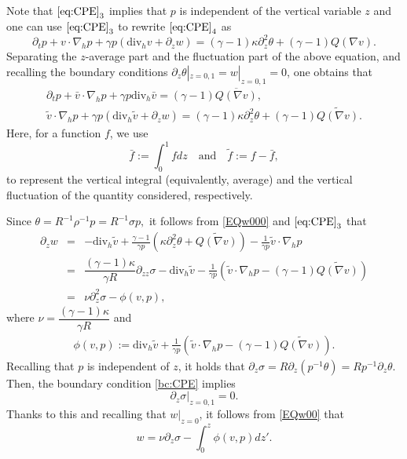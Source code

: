 \documentclass[12pt,reqno]{amsart}
\numberwithin{equation}{section}
\newcommand{\dz}[0]{\partial_z}
\newcommand{\subeqref}[2]{$\eqref{#1}_{#2}$}
\begin{document}
Note that \subeqref{eq:CPE}{3} implies that $p$ is independent of the vertical variable $z$ and one can use \subeqref{eq:CPE}{3} to rewrite \subeqref{eq:CPE}{4} as
\begin{equation*}
 \partial_tp+v\cdot\nabla_hp+\gamma p(\text{div}_hv+\partial_zw)=(\gamma-1)\kappa\partial_z^2\theta+(\gamma-1)Q(\nabla v).
\end{equation*}
Separating the $z$-average part and the fluctuation part of the above equation, and recalling the boundary conditions $\partial_z\theta|_{z=0,1}=w|_{z=0,1}=0$, one obtains that
\begin{eqnarray}
 \partial_tp+\bar v\cdot\nabla_hp+\gamma p\text{div}_h\bar v=(\gamma-1)\overline{Q(\nabla v)},\label{EQp00}\\
\tilde v\cdot\nabla_hp+\gamma p(\text{div}_h\tilde v+\partial_zw)=(\gamma-1)\kappa\partial_z^2\theta+(\gamma-1)\widetilde{Q(\nabla v)}. \label{EQw000}
\end{eqnarray}
Here, for a function $f$, we use
\begin{equation}\label{TBf}
\bar f:=\int_0^1f dz\quad\mbox{and}\quad  \tilde f:=f-\bar f,
\end{equation}
to represent the vertical integral (equivalently, average) and the vertical fluctuation of the quantity considered, respectively.

Since $\theta = R^{-1} \rho^{-1} p=R^{-1}\sigma p,$
it follows from \eqref{EQw000} and \subeqref{eq:CPE}{3} that
\begin{eqnarray}\label{eq:dz-w}
		 \dz w &=&-\text{div}_h\tilde v+\frac{\gamma-1}{\gamma p}\left(\kappa\partial_z^2\theta+\widetilde{Q(\nabla v)}\right)-\frac{1}{\gamma p}\tilde v\cdot\nabla_hp\nonumber\\
&=&\dfrac{(\gamma-1)\kappa}{\gamma R}\partial_{zz} \sigma -\text{div}_h\tilde v-\frac{1}{\gamma p}\left(\tilde v\cdot\nabla_hp-(\gamma-1)\widetilde{Q(\nabla v)}\right)\nonumber\\
&=&\nu\partial_z^2\sigma-\phi(v,p),\label{EQw00}
\end{eqnarray}
where $\nu=\dfrac{(\gamma-1)\kappa}{\gamma R}$ and
\begin{eqnarray}
  \phi(v,p):=\text{div}_h\tilde v+\frac{1}{\gamma p}\left(\tilde v\cdot\nabla_hp-(\gamma-1)\widetilde{Q(\nabla v)}\right).\label{phi}
\end{eqnarray}
Recalling that $p$ is independent of $z$, it holds that $\dz\sigma=R\dz(p^{-1}\theta)= R p^{-1}\dz\theta$. Then, the boundary condition \eqref{bc:CPE} implies
\begin{equation}\label{bc:rf-CPE}
\dz \sigma\big|_{z=0,1} = 0.
\end{equation}
Thanks to this and recalling that $w|_{z=0}$, it follows from \eqref{EQw00} that
\begin{equation}
  w=\nu\partial_z\sigma-\int_0^z\phi(v,p)dz'.\label{EQw00'}
\end{equation}
\end{document}
